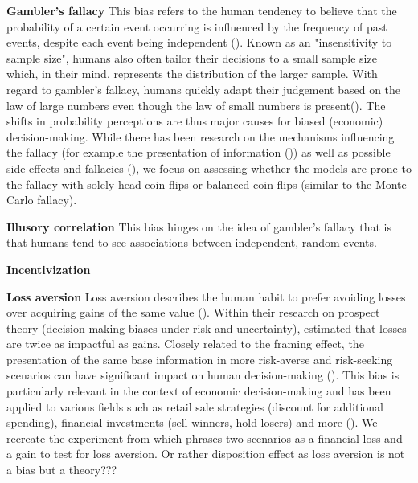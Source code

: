 \par \textbf{Gambler's fallacy} This bias refers to the human tendency to believe that the probability of a certain event occurring is influenced by the frequency of past events, despite each event being independent (\cite{bar1991perception,kovic2019gambler}). Known as an "insensitivity to sample size", humans also often tailor their decisions to a small sample size which, in their mind, represents the distribution of the larger sample. With regard to gambler's fallacy, humans quickly adapt their judgement based on the law of large numbers even though the law of small numbers is present(\cite{tversky1974judgment}). The shifts in probability perceptions are thus major causes for biased (economic) decision-making. While there has been research on the mechanisms influencing the fallacy (for example the presentation of information (\cite{barron2010role})) as well as possible side effects and fallacies (\cite{kovic2019gambler}), we focus on assessing whether the models are prone to the fallacy with solely head coin flips or balanced coin flips (similar to the Monte Carlo fallacy).

\par \textbf{Illusory correlation} This bias hinges on the idea of gambler's fallacy that is that humans tend to see associations between independent, random events.

\par \textbf{Incentivization} 

\par \textbf{Loss aversion} Loss aversion describes the human habit to prefer avoiding losses over acquiring gains of the same value  (\cite{liu2023review}). Within their research on prospect theory (decision-making biases under risk and uncertainty), \cite{tversky1992advances} estimated that losses are twice as impactful as gains. Closely related to the framing effect, the presentation of the same base information in more risk-averse and risk-seeking scenarios can have significant impact on human decision-making (\cite{druckman2001evaluating}). This bias is particularly relevant in the context of economic decision-making and has been applied to various fields such as retail sale strategies (discount for additional spending), financial investments (sell winners, hold losers) and more (\cite{liu2023review}). We recreate the experiment from \cite{thaler2015misbehaving} which phrases two scenarios as a financial loss and a gain to test for loss aversion. Or rather disposition effect as loss aversion is not a bias but a theory???

